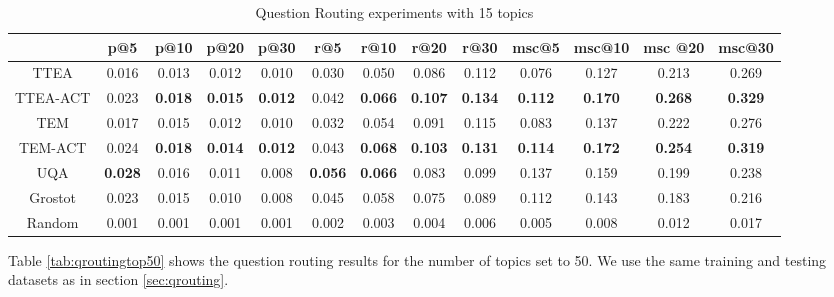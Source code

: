 {{{{{{{\begin{sidewaystable}
\caption{Question Routing experiments with 15 topics}
\label{tab:qroutingtop15}
\centering
\begin{tabular}{|c|c|c|c|c|c|c|c|c|c|c|c|c|}
\hline
 & p@5    &p@10    &p@20   & p@30 &r@5 & r@10 & r@20 &r@30 & msc@5 & msc@10 &msc @20 &msc@30  \\ \hline
TTEA&0.016&0.013&0.012&0.010&0.030&0.050&0.086&0.112&0.076&0.127&0.213&0.269 \\ \hline
TTEA-ACT&0.023&\textbf{0.018}&\textbf{0.015}&\textbf{0.012}&0.042&\textbf{0.066}&\textbf{0.107}&\textbf{0.134}&\textbf{0.112}&\textbf{0.170}&\textbf{0.268}&\textbf{0.329} \\ \hline
TEM&0.017&0.015&0.012&0.010&0.032&0.054&0.091&0.115&0.083&0.137&0.222&0.276 \\ \hline
TEM-ACT&0.024&\textbf{0.018}&\textbf{0.014}&\textbf{0.012}&0.043&\textbf{0.068}&\textbf{0.103}&\textbf{0.131}&\textbf{0.114}&\textbf{0.172}&\textbf{0.254}&\textbf{0.319} \\ \hline
UQA&\textbf{0.028}&0.016&0.011&0.008&\textbf{0.056}&\textbf{0.066}&0.083&0.099&0.137&0.159&0.199&0.238 \\ \hline
Grostot&0.023&0.015&0.010&0.008&0.045&0.058&0.075&0.089&0.112&0.143&0.183&0.216 \\ \hline
Random&0.001&0.001&0.001&0.001&0.002&0.003&0.004&0.006&0.005&0.008&0.012&0.017 \\ \hline
\end{tabular}
\end{sidewaystable}

Table \ref{tab:qroutingtop50} shows the question routing results for the number of topics set to 50. We use the same training and testing datasets as in section \ref{sec:qrouting}.


}}}}}}}
